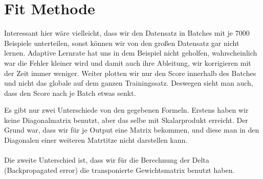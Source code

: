 \section*{Fit Methode}

Interessant hier wäre vielleicht, dass wir den Datensatz in Batches mit je 7000 Beispiele unterteilen, sonst
können wir von den großen Datensatz gar nicht lernen. Adaptive Lernrate hat uns in dem Beispiel nicht geholfen,
wahrscheinlich war die Fehler kleiner wird und damit auch ihre Ableitung, wir korrigieren mit der Zeit immer
weniger. Weiter plotten wir nur den Score innerhalb des Batches und nicht das globale auf dem ganzen Trainingssatz.
Deswegen sieht man auch, dass den Score nach je Batch etwas senkt.

Es gibt nur zwei Unterschiede von den gegebenen Formeln. Erstens haben wir keine Diagonalmatrix benutzt,
aber das selbe mit Skalarprodukt erreicht. Der Grund war, dass wir für je Output eine Matrix bekommen, und diese man
in den Diagonalen einer weiteren Matrtitze nicht darstellen kann. \\ \\

Die zweite Unterschied ist, dass wir für die Berechnung der Delta (Backpropagated error) die transponierte
Gewichtsmatrix benutzt haben.

